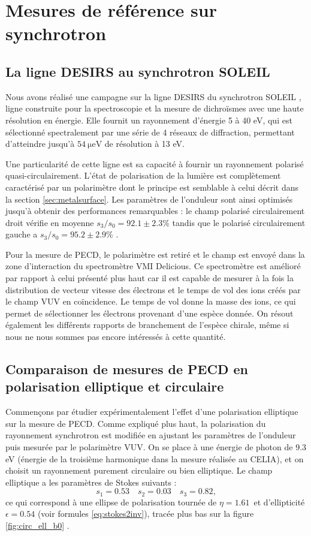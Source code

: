 \section{Mesures de référence sur synchrotron}
\subsection{La ligne DESIRS au synchrotron SOLEIL}
Nous avons réalisé une campagne sur la ligne DESIRS du synchrotron SOLEIL , ligne construite pour la spectroscopie et la mesure de dichroïsmes avec une haute résolution en énergie. Elle fournit un rayonnement d'énergie 5 à 40 eV, qui est sélectionné spectralement par une série de 4 réseaux de diffraction, permettant d'atteindre jusqu'à $\SI{54}{\micro\eV}$ de résolution à 13 eV.

Une particularité de cette ligne est sa capacité à fournir un rayonnement polarisé quasi-circulairement. L'état de polarisation de la lumière est complètement caractérisé par un polarimètre dont le principe est semblable à celui décrit dans la section \ref{sec:metalsurface}. Les paramètres de l'onduleur sont ainsi optimisés jusqu'à obtenir des performances remarquables : le champ polarisé circulairement droit vérifie en moyenne $s_3/s_0=92.1\pm2.3$\% tandis que le polarisé circulairement gauche a $s_3/s_0=95.2\pm2.9$\% .

Pour la mesure de PECD, le polarimètre est retiré et le champ est envoyé dans la zone d'interaction du spectromètre VMI Delicious. Ce spectromètre est amélioré par rapport à celui présenté plus haut car il est capable de mesurer à la fois la distribution de vecteur vitesse des électrons et le temps de vol des ions créés par le champ VUV en coïncidence. Le temps de vol donne la masse des ions, ce qui permet de sélectionner les électrons provenant d'une espèce donnée. On résout également les différents rapports de branchement de l'espèce chirale, même si nous ne nous sommes pas encore intéressés à cette quantité.

\subsection{Comparaison de mesures de PECD en polarisation elliptique et circulaire}
Commençons par étudier expérimentalement l'effet d'une polarisation elliptique sur la mesure de PECD. Comme expliqué plus haut, la polarisation du rayonnement synchrotron est modifiée en ajustant les paramètres de l'onduleur puis mesurée par le polarimètre VUV. On se place à une énergie de photon de 9.3 eV (énergie de la troisième harmonique dans la mesure réalisée au CELIA), et on choisit un rayonnement purement circulaire ou bien elliptique. Le champ elliptique a les paramètres de Stokes suivants :
\begin{equation}
s_1=0.53\quad s_2=0.03\quad s_3=0.82, 
\end{equation}
ce qui correspond à une ellipse de polarisation tournée de $\eta=1.61$\degres~et d'ellipticité $\epsilon = 0.54$ (voir formules \ref{eq:stokes2inv}), tracée plus bas sur la figure \ref{fig:circ_ell_b0} .
 
